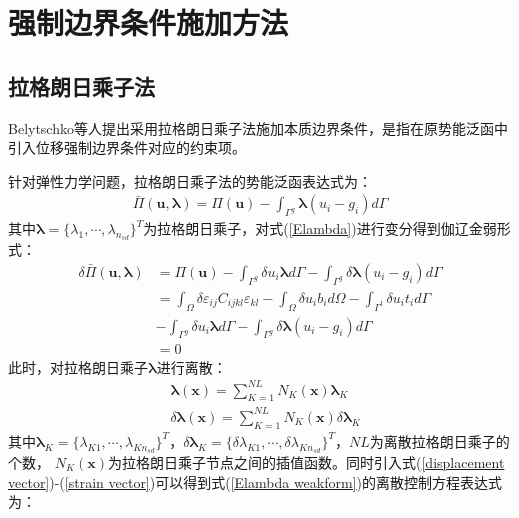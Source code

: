 \chapter{强制边界条件施加方法}
\section{拉格朗日乘子法}
Belytschko等人\cite{}提出采用拉格朗日乘子法施加本质边界条件，是指在原势能泛函中引入位移强制边界条件对应的约束项。\par
针对弹性力学问题，拉格朗日乘子法的势能泛函表达式为：
\begin{equation}\label{Elambda}
\begin{split}
    \bar{\Pi}(\pmb{u},\pmb{\lambda})=\Pi(\pmb{u})-\int_{\Gamma^g}\pmb{\lambda}(u_i-g_i)d\Gamma
\end{split}
\end{equation}   
其中$\pmb{\lambda}=\{\lambda_1,\dotsb,\lambda_{n_{sd}}\}^T$为拉格朗日乘子，对式(\ref{Elambda})进行变分得到伽辽金弱形式：
\begin{equation}\label{Elambda weakform}
\begin{split}
        \delta\bar{\Pi}(\pmb{u},\pmb{\lambda})&=\Pi(\pmb{u})-\int_{\Gamma^g}\delta u_i\pmb{\lambda}d\Gamma-\int_{\Gamma^g}\delta\pmb{\lambda}(u_i-g_i)d\Gamma\\
       &=\int_{\Omega}\delta\varepsilon_{ij}C_{ijkl}\varepsilon_{kl}-\int_{\Omega}\delta u_ib_id\Omega-\int_{\Gamma^t}\delta u_it_id\Gamma\\
       &-\int_{\Gamma^g}\delta u_i\pmb{\lambda}d\Gamma-\int_{\Gamma^g}\delta\pmb{\lambda}(u_i-g_i)d\Gamma\\
       &=0
\end{split}
\end{equation} 
此时，对拉格朗日乘子$\pmb{\lambda}$进行离散：
\begin{equation}\label{lambdalisan}
\begin{split}
    &\pmb{\lambda}(\pmb{x})=\sum_{K=1}^{N\!L}N_K(\pmb{x})\pmb \lambda_K\\
&\delta\pmb{\lambda}(\pmb{x})=\sum_{K=1}^{N\!L}N_K(\pmb{x})\delta\pmb \lambda_K
\end{split}
\end{equation}
其中$\pmb \lambda_K=\{\lambda_{K1},\dotsb,\lambda_{Kn_{sd}}\}^T$，$\delta\pmb \lambda_K=\{\delta\lambda_{K1},\dotsb,\delta\lambda_{Kn_{sd}}\}^T$，$N\!L$为离散拉格朗日乘子的个数，
$N_K(\pmb{x})$为拉格朗日乘子节点之间的插值函数。同时引入式(\ref{displacement vector})-(\ref{strain vector})可以得到式(\ref{Elambda weakform})的离散控制方程表达式为：
